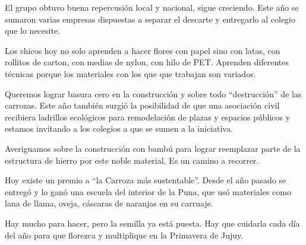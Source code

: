 \documentclass[]{article}
\begin{document}
El grupo obtuvo buena repercusión local y nacional, sigue creciendo.
Este año se sumaron varias empresas dispuestas a separar el descarte y
entregarlo al colegio que lo necesite.

Los chicos hoy no solo aprenden a hacer flores con papel sino con latas,
con rollitos de carton, con medias de nylon, con hilo de PET. Aprenden
diferentes técnicas porque los materiales con los que que trabajan son
variados.

Queremos lograr basura cero en la construcción y sobre todo
``destrucción'' de las carrozas. Este año también surgió la posibilidad
de que una asociación civil recibiera ladrillos ecológicos para
remodelación de plazas y espacios públicos y estamos invitando a los
colegios a que se sumen a la iniciativa.

Averiguamos sobre la construcción con bambú para lograr reemplazar parte
de la estructura de hierro por este noble material. Es un camino a
recorrer.

Hoy existe un premio a ``la Carroza más sustentable''. Desde el año
pasado se entregó y lo ganó una escuela del interior de la Puna, que usó
materiales como lana de llama, oveja, cáscaras de naranjas en su
carruaje.

Hay mucho para hacer, pero la semilla ya está puesta. Hay que cuidarla
cada día del año para que florezca y multiplique en la Primavera de
Jujuy.
\end{document}

